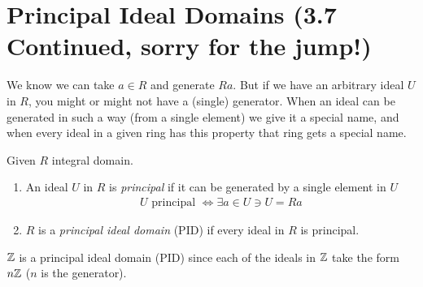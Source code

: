 \section{Principal Ideal Domains (3.7 Continued, sorry for the jump!)}
We know we can take $a\in R$ and generate $Ra$. But if we have an arbitrary ideal $U$ in $R$, you might or might not have a (single) generator. 
When an ideal can be generated in such a way (from a single element) we give it a special name, and when every ideal in a given ring has this property that ring gets a special name.
\begin{definition}
    Given $R$ integral domain.
    \begin{enumerate}
        \item An ideal $U$ in $R$ is \textit{principal} if it can be generated by a single element in $U$
        \begin{align}
            U \text{ principal }\iff \exists a \in U \ni U = Ra \nonumber
        \end{align}
        \item $R$ is a \textit{principal ideal domain} (PID) if every ideal in $R$ is principal.
    \end{enumerate}
\end{definition}
${\mathbb{ Z}}$ is a principal ideal domain (PID) since each of the ideals in ${\mathbb{ Z}}$ take the form $n{\mathbb{ Z}}$ ($n$ is the generator). 
